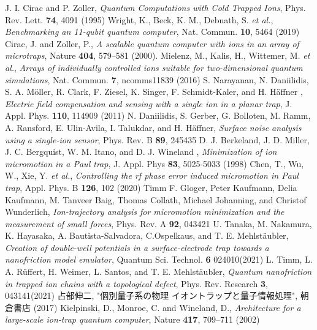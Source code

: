 \begin{thebibliography}{99}
	 J. I. Cirac and P. Zoller, \textit{Quantum Computations with Cold Trapped Ions}, Phys. Rev. Lett. \textbf{74}, 4091 (1995)
	  Wright, K., Beck, K. M., Debnath, S. \textit{et al.}, \textit{Benchmarking an 11-qubit quantum computer}, Nat. Commun. \textbf{10}, 5464 (2019)
	 Cirac, J. and Zoller, P., \textit{A scalable quantum computer with ions in an array of microtraps}, Nature \textbf{404}, 579–581 (2000). 
	 Mielenz, M., Kalis, H., Wittemer, M. \textit{et al.}, \textit{Arrays of individually controlled ions suitable for two-dimensional quantum simulations}, Nat. Commun. \textbf{7}, ncomms11839 (2016)
	 S. Narayanan, N. Daniilidis, S. A. Möller, R. Clark, F. Ziesel, K. Singer, F. Schmidt-Kaler, and H. Häffner , \textit{Electric field compensation and sensing with a single ion in a planar trap}, J. Appl. Phys. \textbf{110}, 114909 (2011)
	 N. Daniilidis, S. Gerber, G. Bolloten, M. Ramm, A. Ransford, E. Ulin-Avila, I. Talukdar, and H. Häffner, \textit{Surface noise analysis using a single-ion sensor}, Phys. Rev. B \textbf{89}, 245435
	 D. J. Berkeland, J. D. Miller, J. C. Bergquist, W. M. Itano, and D. J. Wineland , \textit{Minimization of ion micromotion in a Paul trap}, J. Appl. Phys \textbf{83}, 5025-5033 (1998)
	 Chen, T., Wu, W., Xie, Y. \textit{et al.}, \textit{Controlling the rf phase error induced micromotion in Paul trap}, Appl. Phys. B \textbf{126}, 102 (2020)
	 Timm F. Gloger, Peter Kaufmann, Delia Kaufmann, M. Tanveer Baig, Thomas Collath, Michael Johanning, and Christof Wunderlich, \textit{Ion-trajectory analysis for micromotion minimization and the measurement of small forces}, Phys. Rev. A \textbf{92}, 043421
	 U. Tanaka, M. Nakamura, K. Hayasaka, A. Bautista-Salvadora, C.Ospelkaus, and T. E. Mehlstäubler, \textit{Creation of double-well potentials in a surface-electrode trap towards a nanofriction model emulator}, Quantum Sci. Technol. \textbf{6} 024010(2021)
	 L. Timm, L. A. Rüffert, H. Weimer, L. Santos, and T. E. Mehlstäubler, \textit{Quantum nanofriction in trapped ion chains with a topological defect}, Phys. Rev. Research \textbf{3}, 043141(2021)
	 占部伸二, "個別量子系の物理 イオントラップと量子情報処理", 朝倉書店 (2017)
	 Kielpinski, D., Monroe, C. and Wineland, D., \textit{Architecture for a large-scale ion-trap quantum computer}, Nature \textbf{417}, 709–711 (2002)

\end{thebibliography}
